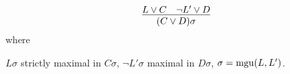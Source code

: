 

\[
	\infer
	[]
	{(C \lor D)\sigma}
	{L \lor C& \lnot L'\lor D}
		\]
		where 
		\begin{center}
		$L\sigma$ strictly maximal in $C\sigma$, $\lnot L'\sigma$ maximal in $D\sigma$, $\sigma=\operatorname{mgu}(L,L')$.
		\end{center}
